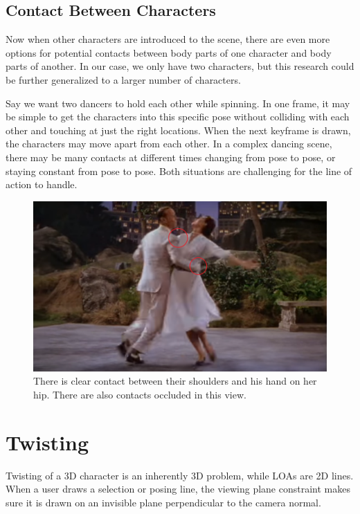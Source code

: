 \subsection{Contact Between Characters}
Now when other characters are introduced to the scene, there are even more options for potential contacts between body parts of one character and body parts of another. In our case, we only have two characters, but this research could be further generalized to a larger number of characters.

Say we want two dancers to hold each other while spinning. In one frame, it may be simple to get the characters into this specific pose without colliding with each other and touching at just the right locations. When the next keyframe is drawn, the characters may move apart from each other. In a complex dancing scene, there may be many contacts at different times changing from pose to pose, or staying constant from pose to pose. Both situations are challenging for the line of action to handle.

\begin{figure}[!h]
\centering
\includegraphics[scale=0.5]{img/contact}
\caption{There is clear contact between their shoulders and his hand on her hip. There are also contacts occluded in this view.}
\end{figure}

\section{Twisting}
Twisting of a 3D character is an inherently 3D problem, while LOAs are 2D lines. When a user draws a selection or posing line, the viewing plane constraint makes sure it is drawn on an invisible plane perpendicular to the camera normal. 

